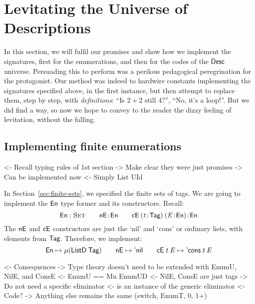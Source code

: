 \section{Levitating the Universe of Descriptions}
\label{sec:desc-levitate}

In this section, we will fulfil our promises and show how we implement
the signatures, first for the enumerations, and then for the codes of
the $\Desc$ universe.  Persuading this to perform was a perilous
pedagogical peregrination for the protagonist.  Our method was indeed to
hardwire constants implementing the signatures specified above, in the
first instance, but then attempt to replace them, step by step, with
\emph{definitions}: ``Is \(2+2\) still \(4\)?'', ``No, it's a loop!''.
But we did find a way, so now we hope to convey to the reader the
dizzy feeling of levitation, without the falling.



\subsection{Implementing finite enumerations}

\begin{wstructure}
<- Recall typing rules of 1st section
    -> Make clear they were just promises
    -> Can be implemented now
        <- Simply List UId
\end{wstructure}

In Section~\ref{sec:finite-sets}, we specified the
finite sets of tags. We are going to implement the $\EnumU$ type former and
its constructors. Recall:
%
\[\Type{\EnumU}\qquad\Bhab{\NilE}{\EnumU}\qquad
\Bhab{\ConsE{(\Bhab{\M{t}}{\UId})}{(\Bhab{\M{E}}{\EnumU})}}{\EnumU}
\]
%
The $\NilE$ and $\SYMBConsE$ constructors are just the `nil' and
`cons' or ordinary lists, with elements from \(\UId\).
Therefore, we
implement:
%
\[
\EnumU \mapsto \Mu{(\ListD\: \UId)}
\qquad
\NilE \mapsto \ListNil
\qquad
\ConsE{\M{t}}{\M{E}} \mapsto \ListCons{\M{t}}{\M{E}}
\]


\begin{wstructure}
<- Consequences
    -> Type theory doesn't need to be extended with EnumU, NilE, and ConsE
        <- EnumU == Mu EnumUD
        <- NilE, ConsE are just tags
    -> Do not need a specific \spi eliminator
        <- \spi is an instance of the generic eliminator
            <- Code?
    -> Anything else remains the same (switch, EnumT, 0, 1+)
\end{wstructure}


